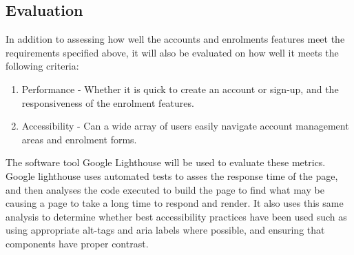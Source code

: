 \subsection{Evaluation}
In addition to assessing how well the accounts and enrolments features meet the requirements specified above, it will also be evaluated on how well it meets the following criteria:
\begin{enumerate}
    \item Performance - Whether it is quick to create an account or sign-up, and the responsiveness of the enrolment features.
    \item Accessibility - Can a wide array of users easily navigate account management areas and enrolment forms.
\end{enumerate}
The software tool Google Lighthouse will be used to evaluate these metrics. Google lighthouse uses automated tests to asses the response time of the page, and then analyses the code executed to build the page to find what may be causing a page to take a long time to respond and render. It also uses this same analysis to determine whether best accessibility practices have been used such as using appropriate alt-tags and aria labels where possible, and ensuring that components have proper contrast.